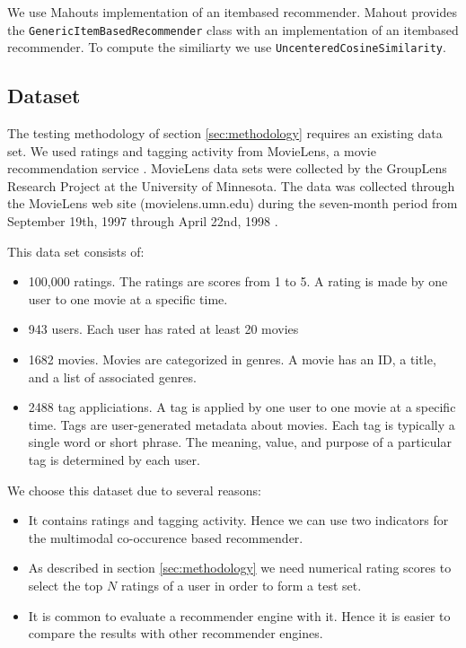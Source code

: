 We use Mahouts implementation of an \gls{itembased} recommender. Mahout provides the \verb|GenericItemBasedRecommender| class with an implementation of an \gls{itembased} recommender. To compute the similiarty we use \verb|UncenteredCosineSimilarity|.

\subsection{Dataset}
\label{sec:dataset}

The testing methodology of section \ref{sec:methodology} requires an existing data set. We used ratings and tagging activity from MovieLens, a movie recommendation service \cite{movielensdata}.
MovieLens data sets were collected by the GroupLens Research Project at the University of Minnesota. The data was collected through the MovieLens web site (movielens.umn.edu) during the seven-month period from September 19th, 1997 through April 22nd, 1998 \cite{movielensdata}.

This data set consists of:
\begin{itemize}
\item 100,000 ratings. The ratings are scores from 1 to 5. A rating is made by one user to one movie at a specific time. 

\item 943 users. Each user has rated at least 20 movies
\item 1682 movies. Movies are categorized in genres. A movie has an ID, a title, and a list of associated genres. 
\item 2488 \gls{tag} appliciations. A \gls{tag} is applied by one user to one movie at a specific time. Tags are user-generated metadata about movies. Each tag is typically a single word or short phrase. The meaning, value, and purpose of a particular tag is determined by each user.
\end{itemize}
 
We choose this dataset due to several reasons:
\begin{itemize}
\item It contains ratings and tagging activity. Hence we can use two indicators for the multimodal co-occurence based recommender.
\item As described in section \ref{sec:methodology} we need numerical rating scores to select the top $N$ ratings of a user in order to form a test set. 
\item  It is common to evaluate a recommender engine with it. Hence it is easier to compare the results with other recommender engines. 
\end{itemize}



